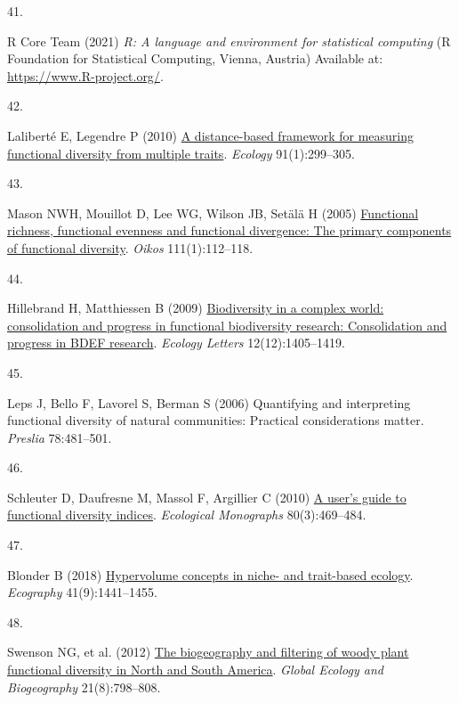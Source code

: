 \documentclass{article}
\newlength{\cslhangindent}
\newlength{\csllabelwidth}
\newlength{\cslentryspacingunit} %
\newenvironment{CSLReferences}[2] %
 {%
  \setlength{\parindent}{0pt}
  \ifodd #1
  \let\oldpar\par
  \def\par{\hangindent=\cslhangindent\oldpar}
  \fi
  \setlength{\parskip}{#2\cslentryspacingunit}
 }%
 {}
\newcommand{\CSLLeftMargin}[1]{\parbox[t]{\csllabelwidth}{#1}}
\newcommand{\CSLRightInline}[1]{\parbox[t]{\linewidth - \csllabelwidth}{#1}\break}
\begin{document}
\begin{CSLReferences}{0}{0}
\leavevmode{}%
\CSLLeftMargin{41. }%
\CSLRightInline{R Core Team (2021) \emph{R: A language and environment
for statistical computing} (R Foundation for Statistical Computing,
Vienna, Austria) Available at: \url{https://www.R-project.org/}.}

\leavevmode{}%
\CSLLeftMargin{42. }%
\CSLRightInline{Laliberté E, Legendre P (2010)
\href{https://doi.org/10.1890/08-2244.1}{A distance-based framework for
measuring functional diversity from multiple traits}. \emph{Ecology}
91(1):299--305.}

\leavevmode{}%
\CSLLeftMargin{43. }%
\CSLRightInline{Mason NWH, Mouillot D, Lee WG, Wilson JB, Setälä H
(2005) \href{http://www.jstor.org/stable/3548774}{Functional richness,
functional evenness and functional divergence: The primary components of
functional diversity}. \emph{Oikos} 111(1):112--118.}

\leavevmode{}%
\CSLLeftMargin{44. }%
\CSLRightInline{Hillebrand H, Matthiessen B (2009)
\href{https://doi.org/10.1111/j.1461-0248.2009.01388.x}{Biodiversity in
a complex world: consolidation and progress in functional biodiversity
research: Consolidation and progress in BDEF research}. \emph{Ecology
Letters} 12(12):1405--1419.}

\leavevmode{}%
\CSLLeftMargin{45. }%
\CSLRightInline{Leps J, Bello F, Lavorel S, Berman S (2006) Quantifying
and interpreting functional diversity of natural communities: Practical
considerations matter. \emph{Preslia} 78:481--501.}

\leavevmode{}%
\CSLLeftMargin{46. }%
\CSLRightInline{Schleuter D, Daufresne M, Massol F, Argillier C (2010)
\href{https://doi.org/10.1890/08-2225.1}{A user's guide to functional
diversity indices}. \emph{Ecological Monographs} 80(3):469--484.}

\leavevmode{}%
\CSLLeftMargin{47. }%
\CSLRightInline{Blonder B (2018)
\href{https://doi.org/10.1111/ecog.03187}{Hypervolume concepts in niche-
and trait-based ecology}. \emph{Ecography} 41(9):1441--1455.}

\leavevmode{}%
\CSLLeftMargin{48. }%
\CSLRightInline{Swenson NG, et al. (2012)
\href{https://doi.org/10.1111/j.1466-8238.2011.00727.x}{The biogeography
and filtering of woody plant functional diversity in North and South
America}. \emph{Global Ecology and Biogeography} 21(8):798--808.}


\end{CSLReferences}
\end{document}
